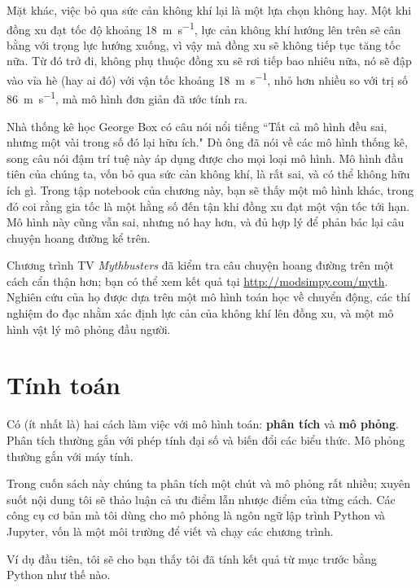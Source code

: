 \documentclass[12pt]{book}
\theoremstyle{exercise}
\begin{document}
Mặt khác, việc bỏ qua sức cản không khí lại là một lựa chọn không hay. Một khi đồng xu đạt tốc độ khoảng \SI{18}{\meter\per\second}, lực cản không khí hướng lên trên sẽ cân bằng với trọng lực hướng xuống, vì vậy mà đồng xu sẽ không tiếp tục tăng tốc nữa. Từ đó trở đi, không phụ thuộc đồng xu sẽ rơi tiếp bao nhiêu nữa, nó sẽ đập vào vỉa hè (hay ai đó) với vận tốc khoảng \SI{18}{\meter\per\second}, nhỏ hơn nhiều so với trị số \SI{86}{\meter\per\second}, mà mô hình đơn giản đã ước tính ra.

Nhà thống kê học George Box có câu nói nổi tiếng ``Tất cả mô hình đều sai, nhưng một vài trong số đó lại hữu ích."  Dù ông đã nói về các mô hình thống kê, song câu nói đậm trí tuệ này áp dụng được cho mọi loại mô hình. Mô hình đầu tiên của chúng ta, vốn bỏ qua sức cản không khí, là rất sai, và có thể không hữu ích gì. Trong tập notebook của chương này, bạn sẽ thấy một mô hình khác, trong đó coi rằng gia tốc là một hằng số đến tận khi đồng xu đạt một vận tốc tới hạn. Mô hình này cũng vẫn sai, nhưng nó hay hơn, và đủ hợp lý để phản bác lại câu chuyện hoang đường kể trên.


Chương trình TV {\it Mythbusters} đã kiểm tra câu chuyện hoang đường trên một cách cẩn thận hơn; bạn có thể xem kết quả tại \url{http://modsimpy.com/myth}.  Nghiên cứu của họ được dựa trên một mô hình toán học về chuyển động, các thí nghiệm đo đạc nhằm xác định lực cản của không khí lên đồng xu, và một mô hình vật lý mô phỏng đầu người.



\section{Tính toán}
\label{computation}

Có (ít nhất là) hai cách làm việc với mô hình toán: {\bf phân tích} và {\bf mô phỏng}.  Phân tích thường gắn với phép tính đại số và biến đổi các biểu thức. Mô phỏng thường gắn với máy tính.

Trong cuốn sách này chúng ta phân tích một chút và mô phỏng rất nhiều; xuyên suốt nội dung tôi sẽ thảo luận cả ưu điểm lẫn nhược điểm của từng cách. Các công cụ cơ bản mà tôi dùng cho mô phỏng là ngôn ngữ lập trình Python và Jupyter, vốn là một môi trường để viết và chạy các chương trình.

Ví dụ đầu tiên, tôi sẽ cho bạn thấy tôi đã tính kết quả từ mục trước bằng Python như thế nào. 
\end{document}
